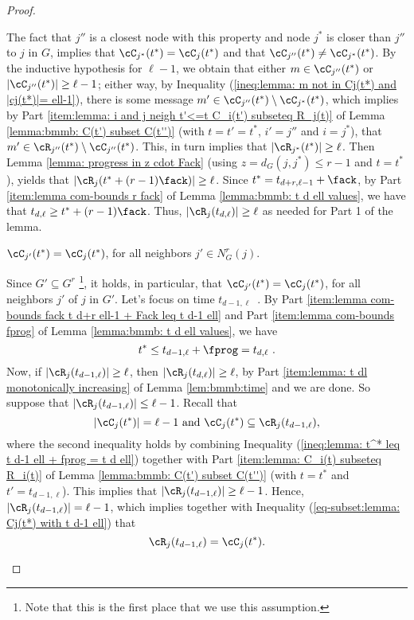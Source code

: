 \begin{proof}
\begin{enumerate}
The fact that $j''$ is a closest node with this property and node $j^*$ is closer than $j''$ to $j$ in $G$, implies that
$\cC_{j^*}(t^*) = \cC_j(t^*)$ and that $\cC_{j''}(t^*) \neq \cC_{j^*}(t^*)$.
By the inductive hypothesis for $\ell-1$, we obtain that either $m\in \cC_{j''}(t^*)$ or $|\cC_{j''}(t^*)| \geq \ell-1$;
either way, by Inequality
(\ref{ineq:lemma: m not in Cj(t*) and |cj(t*)|= ell-1}),
there is some message $m'\in \cC_{j''}(t^*) \setminus \cC_{j^*}(t^*)$,
which implies by
Part \ref{item:lemma: i and j neigh t'<=t C_i(t') subseteq R_j(t)}
of Lemma \ref{lemma:bmmb: C(t') subset C(t'')}
(with $t=t'=t^*$, $i'=j''$ and $i=j^*$),
that $m'\in \cR_{j''}(t^*) \setminus \cC_{j''}(t^*)$.
This, in turn implies that
$|\cR_{j^*}(t^*)| \geq \ell$.
Then Lemma \ref{lemma: progress in z cdot Fack}
(using $z = d_G(j,j^*)\leq r-1$ and $t = t^*$),
yields that $|\cR_j(t^* + (r-1) \fack)| \geq \ell$.
Since $t^*= t_{d+r,\ell-1}+ \fack$,
by Part \ref{item:lemma com-bounds r fack}
of Lemma \ref{lemma:bmmb: t d ell values},
we have that $t_{d,\ell} \geq t^* + (r-1) \fack$.
Thus, $|\cR_j(t_{d,\ell})| \geq \ell$ as needed for Part 1 of the lemma.




 $\cC_{j'}(t^*) = \cC_j(t^*)$, for all neighbors $j'\in N^r_G(j)$.

Since $G' \subseteq G^r$
\footnote{
Note that this is the first place that we use this assumption.
}, it holds, in particular, that $\cC_{j'}(t^*) = \cC_{j}(t^*)$, for all neighbors $j'$ of $j$ in $G'$.
Let's focus on time $t_{d-1,\ell}$~.
By Part \ref{item:lemma com-bounds fack t d+r ell-1 + Fack leq t d-1 ell}
and Part \ref{item:lemma com-bounds fprog}
of Lemma \ref{lemma:bmmb: t d ell values},
we have
\begin{equation}
t^* \leq t_{d-1,\ell} + \fprog = t_{d,\ell} ~.
\label{ineq:lemma: t^* leq t d-1 ell + fprog = t d ell}
\end{equation}
Now, if $|\cR_{j}(t_{d-1,\ell})| \geq \ell$, then $|\cR_{j}(t_{d,\ell})| \geq \ell$, by
Part \ref{item:lemma: t dl monotonically increasing}
of Lemma \ref{lem:bmmb:time} and we are done.
So suppose that $|\cR_{j}(t_{d-1,\ell})| \leq \ell-1$.
Recall that
\begin{equation}
|\cC_{j}(t^*)|=\ell-1 \mbox{ and } \cC_{j}(t^*) \subseteq \cR_{j}(t_{d-1,\ell}),
\label{eq-subset:lemma: Cj(t*) with t d-1 ell}
\end{equation}
where the second inequality holds by combining
Inequality (\ref{ineq:lemma: t^* leq t d-1 ell + fprog = t d ell})
together with Part \ref{item:lemma: C_i(t) subseteq R_i(t)}
of Lemma \ref{lemma:bmmb: C(t') subset C(t'')}
(with $t=t^*$ and $t'=t_{d-1,\ell}$).
This implies that $|\cR_{j}(t_{d-1,\ell})| \geq \ell-1$.
Hence, $|\cR_{j}(t_{d-1,\ell})| = \ell-1$, which implies together with Inequality
(\ref{eq-subset:lemma: Cj(t*) with t d-1 ell})  that
\begin{equation}
\cR_{j}(t_{d-1,\ell})=\cC_{j}(t^*).
\label{eq:lemma: Rj t d-1 ell = Cj(t*)}
\end{equation}



\end{enumerate}
\end{proof}
